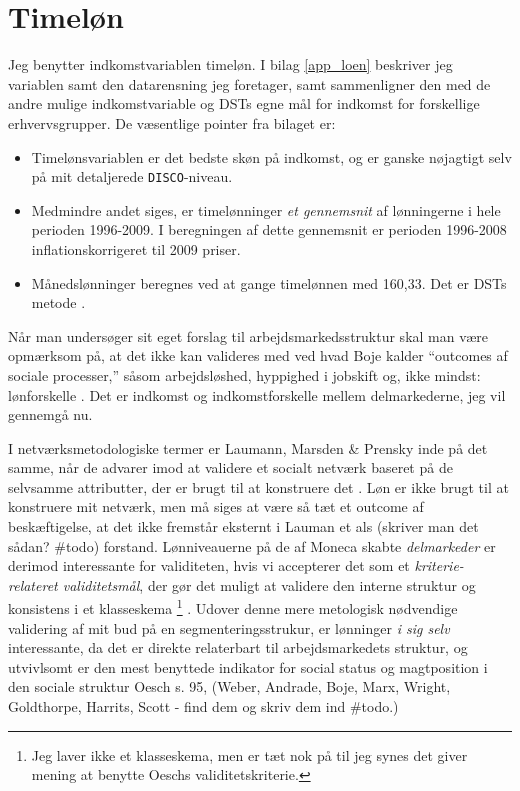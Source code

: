 \section{Timeløn}

Jeg benytter indkomstvariablen timeløn. I bilag \ref{app_loen} beskriver jeg variablen samt den datarensning jeg foretager, samt sammenligner den med de andre mulige indkomstvariable og DSTs egne mål for indkomst for forskellige erhvervsgrupper. De væsentlige pointer fra bilaget er:
%
 \begin{itemize}
  \itemsep -0.5em
  	\item Timelønsvariablen er det bedste skøn på indkomst, og er ganske nøjagtigt selv på mit detaljerede \texttt{DISCO}-niveau.
  	\item Medmindre andet siges, er timelønninger \emph{et gennemsnit} af lønningerne i hele perioden 1996-2009. I beregningen af dette gennemsnit er perioden 1996-2008 inflationskorrigeret til 2009 priser.
  	\item Månedslønninger beregnes ved at gange timelønnen med 160,33. Det er DSTs metode \parencite[32]{DST2009}.
 \end{itemize}
%
Når man undersøger sit eget forslag til arbejdsmarkedsstruktur skal man være opmærksom på, at det ikke kan valideres med ved hvad Boje kalder “outcomes af sociale processer,” såsom arbejdsløshed, hyppighed i jobskift og, ikke mindst: lønforskelle \parencite[28]{Boje1985}. Det er indkomst og indkomstforskelle mellem delmarkederne, jeg vil gennemgå nu. 

I netværksmetodologiske termer er Laumann, Marsden \& Prensky inde på det samme, når de advarer imod at validere et socialt netværk baseret på de selvsamme attributter, der er brugt til at konstruere det \parencite[29]{Laumann1983}. Løn er ikke brugt til at konstruere mit netværk, men må siges at være så tæt et outcome af beskæftigelse, at det ikke fremstår eksternt i Lauman et als (skriver man det sådan? \#todo) forstand. Lønniveauerne på de af Moneca skabte \emph{delmarkeder} er derimod interessante for validiteten, hvis vi accepterer det som et \emph{kriterie-relateret validitetsmål}, der gør det muligt at validere den interne struktur og konsistens i et klasseskema \parencite[94]{Oesch2006a}%
%
\footnote{ Jeg laver ikke et klasseskema, men er tæt nok på til jeg synes det giver mening at benytte Oeschs validitetskriterie.}%
%
. Udover denne mere metologisk nødvendige validering af mit bud på en segmenteringsstrukur, er lønninger \emph{i sig selv} interessante, da det er direkte relaterbart til arbejdsmarkedets struktur, og utvivlsomt er den mest benyttede indikator for social status og magtposition i den sociale struktur Oesch s. 95, (Weber, Andrade, Boje, Marx, Wright, Goldthorpe, Harrits, Scott - find dem og skriv dem ind \#todo.) 





